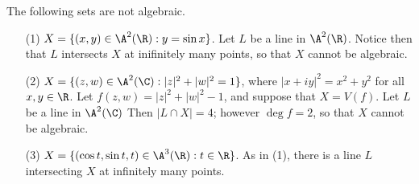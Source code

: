 \begin{example}\label{example_1.7}
    The following sets are not algebraic.
    \begin{enumerate}
        \item[(1)] $X=\{(x,y) \in \A^2(\R) : y=\sin{x}\}$. Let $L$ be a line in
             $\A^2(\R)$. Notice then that $L$ intersects $X$ at inifinitely many
             points, so that $X$ cannot be algebraic.

        \item[(2)] $X=\{(z,w) \in \A^2(\C) : |z|^2+|w|^2=1\}$, where
            $|x+iy|^2=x^2+y^2$ for all $x,y \in \R$. Let $f(z,w)=|z|^2+|w|^2-1$,
            and suppose that  $X=V(f)$. Let $L$ be a line in  $\A^2(\C)$ Then
            $|L \cap X|=4$; however  $\deg{f}=2$, so that $X$ cannot be
            algebraic.

        \item[(3)] $X=\{(\cos{t}, \sin{t}, t) \in \A^3(\R) : t \in \R\}$. As in
            (1), there is a line $L$ intersecting $X$ at infinitely many points.
    \end{enumerate}
\end{example}

